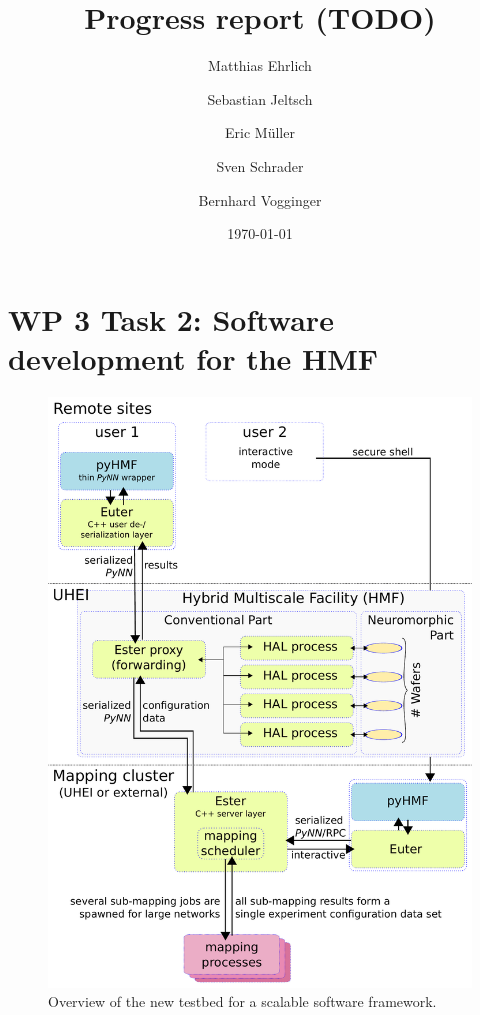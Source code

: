 \documentclass[12pt,oneside]{scrartcl}
\title{Progress report (TODO)}
\date{\today}
\author{
Matthias Ehrlich \and
Sebastian Jeltsch \and
Eric M\"uller \and
Sven Schrader \and
Bernhard Vogginger
}
\begin{document}
\maketitle


\section*{WP 3 Task 2: Software development for the HMF}


\begin{figure}[ht!]
	\begin{center}
	\includegraphics[height=.9\textheight,clip]{arch_brainscales_progress.pdf}
	\end{center}
	\caption{\label{fig:overview-ester}
	Overview of the new testbed for a scalable software framework.
	}
\end{figure}
\end{document}
